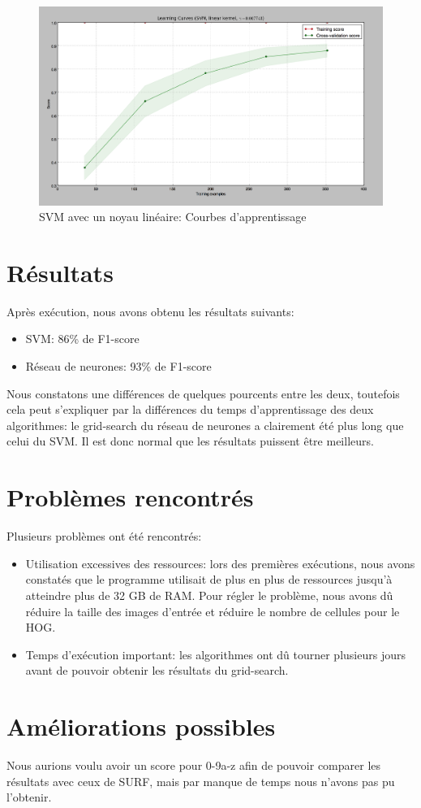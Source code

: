 \begin{figure}[!h]
\includegraphics[width=\textwidth]{pictures/hog-svm-training}
\caption{SVM avec un noyau linéaire: Courbes d'apprentissage}
\label{fig:hog-svm-training}
\end{figure}

\section{Résultats}

Après exécution, nous avons obtenu les résultats suivants:
\begin{itemize}
\item SVM: 86\% de F1-score
\item Réseau de neurones: 93\% de F1-score
\end{itemize}
Nous constatons une différences de quelques pourcents entre les deux, toutefois cela peut s'expliquer par la différences du temps d'apprentissage des deux algorithmes: le grid-search du réseau de neurones a clairement été plus long que celui du SVM. Il est donc normal que les résultats puissent être meilleurs.

\section{Problèmes rencontrés}
Plusieurs problèmes ont été rencontrés:

\begin{itemize}
\item Utilisation excessives des ressources: lors des premières exécutions, nous avons constatés que le programme utilisait de plus en plus de ressources jusqu'à atteindre plus de 32 GB de RAM. Pour régler le problème, nous avons dû réduire la taille des images d'entrée et réduire le nombre de cellules pour le HOG.

\item Temps d'exécution important: les algorithmes ont dû tourner plusieurs jours avant de pouvoir obtenir les résultats du grid-search.

\end{itemize}

\section{Améliorations possibles}
Nous aurions voulu avoir un score pour 0-9a-z afin de pouvoir comparer les résultats avec ceux de SURF, mais par manque de temps nous n'avons pas pu l'obtenir.

\newpage
